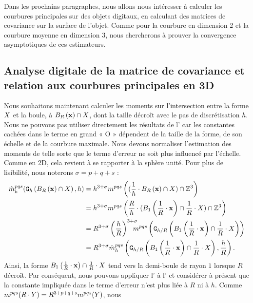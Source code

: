 Dans les prochains paragraphes, nous allons nous intéresser à calculer les
courbures principales sur des objets digitaux, en calculant des matrices de
covariance sur la surface de l'objet. Comme pour la courbure en dimension 2 et
la courbure moyenne en dimension 3, nous chercherons à prouver la convergence
asymptotiques de ces estimateurs.

\subsection{Analyse digitale de la matrice de covariance et
relation aux courbures principales en 3D}
\label{sec:ii-3d}
%
Nous souhaitons maintenant calculer les moments sur l'intersection entre la forme
$X$ et la boule, \cad à $B_{R}\left(\mathbf{x}\right) \cap X$, dont la taille décroît
avec le pas de discrétisation $h$. Nous ne pouvons pas utiliser directement les résultats
de l' car les constantes cachées dans le
terme en grand « O » dépendent de la taille de la forme, de son échelle et de la
courbure maximale. Nous devons normaliser l'estimation des moments de telle sorte
que le terme d'erreur ne soit plus influencé par l'échelle. Comme en 2D, cela
revient à se rapporter à la sphère unité. Pour plus de lisibilité, nous noterons
$\sigma = p + q + s$ :
%
\begin{align} \label{eq:MomentsOnUnitaryBall}
%
  \DMom{pqs}{h}(\DigF{\Ball{R}{\vx} \cap \Shape}{h},h) &= h^{3+\sigma}\Mom{pqs}\left
  ( (\frac{1}{h} \cdot \Ball{R}{\vx} \cap \Shape) \cap \Z^3 \right) \nonumber \\
  &= h^{3+{\sigma}} \Mom{pqs}\left( \frac{R}{h}\cdot(
  \Ball{1}{\frac{1}{R} \cdot \vx} \cap \frac{1}{R} \cdot \Shape) \cap \Z^3 \right) \nonumber \\
  &= R^{3+{\sigma}} \left( \frac{h}{R} \right)^{3+{\sigma}} \hspace{-0.3cm} \Mom{pqs} \left( \DigF{ \Ball{1}{\frac{1}{R}\cdot \vx}\cap\frac{1}{R}\cdot \Shape}{h/R} \right) \nonumber\\
  &= R^{3+{\sigma}}\DMom{pqs}{h}\left( \DigF{ \Ball{1}{\frac{1}{R}\cdot \vx}\cap\frac{1}{R}\cdot \Shape}{h/R}, {\frac{h}{R}} \right).
%
\end{align}
%
Ainsi, la forme $B_{1}\left(\frac{1}{R} \cdot \mathbf{x}\right)\cap\frac{1}{R}\cdot X$
tend vers la demi-boule de rayon $1$ lorsque $R$ décroît. Par conséquent, nous
pouvons appliquer l' à
l' et considérer à présent que la constante
impliquée dans le terme d'erreur n'est plus liée à $R$ ni à $h$. Comme $m^{pqs}(R \cdot Y) = R^{3+p+q+s} m^{pqs}(Y)$, nous
